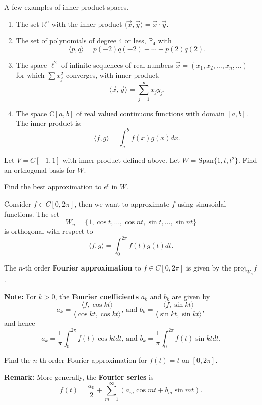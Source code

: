 \begin{enumerate}

 \Problem A few examples of inner product spaces.
\begin{enumerate}
	
	\item The set $\mathbb{R}^n$ with the inner product $\langle \vec{x}, \vec{y}\rangle =\vec{x} \cdot \vec{y}$.
	
	\item The set of polynomials of degree 4 or less, $\mathbb{P}_4$ with $$\langle p, q \rangle = p(-2)q(-2)+\cdots + p(2)q(2).$$
	
	\item The space $\ell^2$ of infinite sequences of real numbers $\vec{x}=(x_{1},x_{2},\ldots,x_{n},\ldots)$ for which $\sum x_j^2 $ converges, with inner product,
	$$\langle \vec{x},\vec{y}\rangle  = \sum_{j=1}^{\infty}x_j y_j.$$
	
	\item The space $\mathrm{C}[a,b]$ of real valued continuous functions with domain $[a,b]$.	The inner product is:	
	$$\langle f,g\rangle  = \int_{a}^b f(x)g(x) dx.$$
	
\end{enumerate}

\newpage

\Problem Let $V=C[-1,1]$ with inner product defined above. Let $W=\text{Span}\{1, t, t^2\}$.
\Part Find an orthogonal basis for $W$.
  
  \vfill
  
\Part Find the best approximation to $e^t$ in $W$.

\vfill

\newpage

Consider $f\in C[0, 2 \pi]$, then we want to approximate $f$ using sinusoidal functions. The set $$W_n=\{1, \cos{t}, \dots, \cos{nt}, \sin{t}, \dots, \sin{nt}\}$$ is orthogonal with respect to $$\langle f,g \rangle = \int_0^{2\pi} f(t) g(t) dt.$$

\begin{defn} The $n$-th order {\bf Fourier approximation} to $f\in C[0,2\pi]$ is given by the $\text{proj}_{W_n}{f}$.
\end{defn}

{\bf Note:}   For $k>0$, the {\bf Fourier coefficients} $a_k$ and $b_k$ are given by $$a_k=\frac{\langle f, \cos{kt} \rangle}{\langle \cos{kt}, \cos{kt}\rangle} \text{, and } b_k=\frac{\langle f, \sin{kt} \rangle}{\langle \sin{kt}, \sin{kt}\rangle},$$ and hence $$a_k=\frac{1}{\pi}\int_0^{2\pi}{f(t)\cos{kt}dt } \text{, and } b_k=\frac{1}{\pi}\int_{0}^{2\pi}{f(t)\sin{kt}dt}.$$



\Problem Find the $n$-th order Fourier approximation for $f(t)=t$ on $[0,2\pi]$.

\vfill

{\bf Remark:} More generally, the {\bf Fourier series} is $$f(t)=\frac{a_0}{2}+\sum_{m=1}^{\infty}{(a_m \cos{mt}+b_m \sin{mt})}.$$

\newpage

\end{enumerate}

